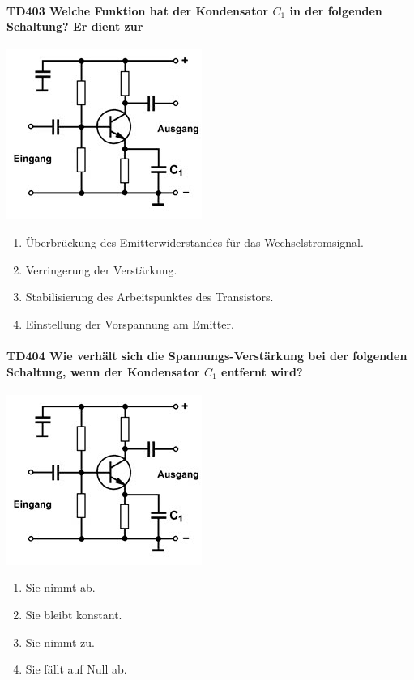 \documentclass[8pt]{article}
\begin{document}
\begin{enumerate}
\begin{enumerate}[nolistsep,label=\Alph*]
\paragraph*{TD403 Welche Funktion hat der Kondensator $C_{1}$ in der folgenden Schaltung? Er dient zur} 
\begin{center}
	\begin{minipage}{\linewidth}
		\centering
		\includegraphics[scale=1.0]{pics/td403_a.jpg}
	\end{minipage}
\end{center}
\begin{enumerate}[nolistsep,label=\Alph*]
\item Überbrückung des Emitterwiderstandes für das Wechselstromsignal.
\item Verringerung der Verstärkung.
\item Stabilisierung des Arbeitspunktes des Transistors.
\item Einstellung der Vorspannung am Emitter.
\end{enumerate}

\paragraph*{TD404 Wie verhält sich die Spannungs-Verstärkung bei der folgenden Schaltung, wenn der Kondensator $C_{1}$ entfernt wird?}
\begin{center}
	\begin{minipage}{\linewidth}
		\centering
		\includegraphics[scale=1.0]{pics/td404_a.jpg}
	\end{minipage}
\end{center}
\begin{enumerate}[nolistsep,label=\Alph*]
\item Sie nimmt ab.
\item Sie bleibt konstant.
\item Sie nimmt zu.
\item Sie fällt auf Null ab.
\end{enumerate}


\end{enumerate}
\end{enumerate}
\end{document}
